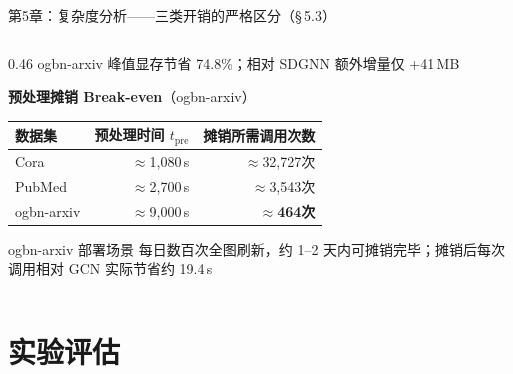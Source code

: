 \documentclass[aspectratio=169,9pt,xcolor=dvipsnames]{beamer}
\newcommand{\highlight}[1]{\textcolor{myred}{\textbf{#1}}}
\newcommand{\blue}[1]{\textcolor{mynavy}{#1}}
\begin{document}
\begin{frame}{第5章：复杂度分析——三类开销的严格区分（§\,5.3）}
\begin{columns}[T]
\begin{column}{0.46\textwidth}
  \vspace{0.05cm}
  ogbn-arxiv 峰值显存节省 \blue{74.8\%}；相对 SDGNN 额外增量仅 +41\,MB

  \vspace{0.2cm}
  \textbf{\blue{预处理摊销 Break-even}}（ogbn-arxiv）

  \vspace{0.05cm}
  \small
  \begin{tabular}{lrr}
    \toprule
    数据集 & 预处理时间 $t_{\mathrm{pre}}$ & 摊销所需调用次数 \\
    \midrule
    Cora       & $\approx$1,080\,s & $\approx$32,727次 \\
    PubMed     & $\approx$2,700\,s & $\approx$3,543次 \\
    ogbn-arxiv & $\approx$9,000\,s & \highlight{$\approx$464次} \\
    \bottomrule
  \end{tabular}

  \vspace{0.1cm}
  \begin{alertblock}{ ogbn-arxiv 部署场景}
       每日数百次全图刷新，约 1--2 天内可摊销完毕；摊销后每次调用相对 GCN 实际节省约 \blue{19.4\,s}
  \end{alertblock}
\end{column}
\end{columns}
\end{frame}

\section{实验评估}
\end{document}
